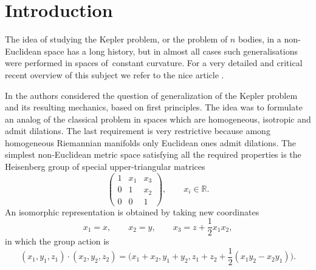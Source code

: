 \section{Introduction}
The idea of studying the Kepler problem, or the problem of $n$ bodies, in a non-Euclidean space has a long history, but in almost all cases such
generalisations were performed in spaces of~con\-stant curvature. For a very detailed and critical recent overview
of this subject we refer to the nice article \cite{borisov:16::}.

In \cite{1} the authors considered the question of generalization of
the Kepler problem and its resulting mechanics, based on first principles. The idea was to
formulate an analog of the classical problem in spaces which are
homogeneous, isotropic and admit dilations. The last requirement is
very restrictive because among homogeneous Riemannian manifolds only
Euclidean ones admit dilations. The simplest non-Euclidean metric
space satisfying all the required properties is the Heisenberg group
of special upper-triangular matrices
\begin{equation*}
 \begin{pmatrix}
 1 & x_1 & x_3 \\ 0 & 1 & x_2 \\ 0 & 0 & 1
 \end{pmatrix}\!,
 \qquad x_i\in\mathbb{R}.
\end{equation*}
An isomorphic representation is obtained by taking new coordinates
\begin{equation*}
 x_1 = x, \qquad x_2 = y, \qquad x_3 = z +\frac12 x_1 x_2,
\end{equation*}
in which the group action is
\begin{equation}
 (x_1,y_1,z_1)\cdot(x_2,y_2,z_2)=\bigg(x_1+x_2,y_1+y_2,z_1+z_2+\frac12(x_1 y_2-x_2 y_1)\bigg).
 \label{groupop}
\end{equation}

